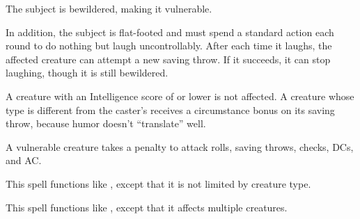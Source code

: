 \spellrng{\rngclose}
\spelldur{\durshort}
\begin{spelleffect}
  The subject is bewildered, making it vulnerable.
\end{spelleffect}
\begin{spellblood}
  In addition, the subject is flat-footed and must spend a standard action each round to do nothing but laugh uncontrollably. After each time it laughs, the affected creature can attempt a new saving throw. If it succeeds, it can stop laughing, though it is still bewildered.
\end{spellblood}
\begin{spellnotes}
  A creature with an Intelligence score of  or lower is not affected. A creature whose type is different from the caster's receives a  circumstance bonus on its saving throw, because humor doesn't ``translate'' well.
\end{spellnotes}
\begin{spellnotes}
  A vulnerable creature takes a  penalty to attack rolls, saving throws, checks, DCs, and AC.
\end{spellnotes}

\begin{spelleffect}
  This spell functions like , except that it is not limited by creature type.
\end{spelleffect}

\begin{spelleffect}
  This spell functions like , except that it affects multiple creatures.
\end{spelleffect}

